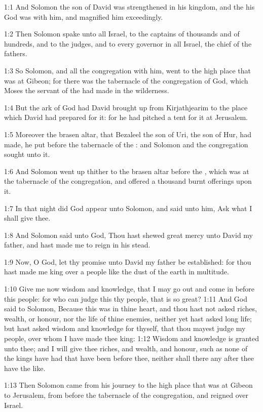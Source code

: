 

1:1 And Solomon the son of David was strengthened in his kingdom, and
the \LORD his God was with him, and magnified him exceedingly.

1:2 Then Solomon spake unto all Israel, to the captains of thousands
and of hundreds, and to the judges, and to every governor in all
Israel, the chief of the fathers.

1:3 So Solomon, and all the congregation with him, went to the high
place that was at Gibeon; for there was the tabernacle of the
congregation of God, which Moses the servant of the \LORD had made in
the wilderness.

1:4 But the ark of God had David brought up from Kirjathjearim to the
place which David had prepared for it: for he had pitched a tent for
it at Jerusalem.

1:5 Moreover the brasen altar, that Bezaleel the son of Uri, the son
of Hur, had made, he put before the tabernacle of the \LORD: and
Solomon and the congregation sought unto it.

1:6 And Solomon went up thither to the brasen altar before the \LORD,
which was at the tabernacle of the congregation, and offered a
thousand burnt offerings upon it.

1:7 In that night did God appear unto Solomon, and said unto him, Ask
what I shall give thee.

1:8 And Solomon said unto God, Thou hast shewed great mercy unto David
my father, and hast made me to reign in his stead.

1:9 Now, O \LORD God, let thy promise unto David my father be
established: for thou hast made me king over a people like the dust of
the earth in multitude.

1:10 Give me now wisdom and knowledge, that I may go out and come in
before this people: for who can judge this thy people, that is so
great?  1:11 And God said to Solomon, Because this was in thine heart,
and thou hast not asked riches, wealth, or honour, nor the life of
thine enemies, neither yet hast asked long life; but hast asked wisdom
and knowledge for thyself, that thou mayest judge my people, over whom
I have made thee king: 1:12 Wisdom and knowledge is granted unto thee;
and I will give thee riches, and wealth, and honour, such as none of
the kings have had that have been before thee, neither shall there any
after thee have the like.

1:13 Then Solomon came from his journey to the high place that was at
Gibeon to Jerusalem, from before the tabernacle of the congregation,
and reigned over Israel.

